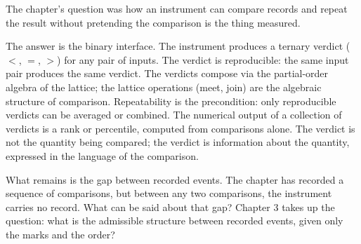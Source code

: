 \begin{bridge}

The chapter's question was how an instrument can compare records and
repeat the result without pretending the comparison is the thing
measured.

The answer is the binary interface. The instrument produces a
ternary verdict ($<$, $=$, $>$) for any pair of inputs. The verdict
is reproducible: the same input pair produces the same verdict. The
verdicts compose via the partial-order algebra of the lattice; the
lattice operations (meet, join) are the algebraic structure of
comparison. Repeatability is the precondition: only reproducible
verdicts can be averaged or combined. The numerical output of a
collection of verdicts is a rank or percentile, computed from
comparisons alone. The verdict is not the quantity being compared;
the verdict is information about the quantity, expressed in the
language of the comparison.

What remains is the gap between recorded events. The chapter has
recorded a sequence of comparisons, but between any two
comparisons, the instrument carries no record. What can be said
about that gap? Chapter 3 takes up the question: what is the
admissible structure between recorded events, given only the marks
and the order?

\end{bridge}


